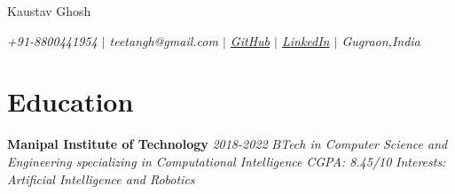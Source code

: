 \documentclass{article}
\makeatletter
\renewcommand{\maketitle}{
    \begin{flushleft}        
        {\huge\rmfamily
        \theauthor}\newline
        \vspace{0.1em}
        \textit{teetangh@gmail.com -- github.com/teetangh}\newline
        \textit{Contact No. -- +91-8800441954}\newline
        \textit{Manipal Institute of Technology}\newline
        \textit{B.Tech in \textbf{Computer Science \& Engineering}}
        \textit{2018 - 2022}\newline
        \textit{Minor in \textbf{Computational Intelligence}}\newline
        \textit{CGPA: 8.45/10}\newline
    \end{flushleft}

}
\makeatother
\begin{document}
\thispagestyle{empty}  %


\begin{center}
    \huge{Kaustav Ghosh}

    \normalsize{
        \textit{
            +91-8800441954 \(|\)
            teetangh@gmail.com \(|\)
            \href{https://www.github.com/teetangh}{GitHub} \(|\)
            \href{https://www.linkedin.com/in/kaustav-ghosh-1538651bb/}{LinkedIn} \(|\)
            Gugraon,India 
        }}
\end{center}

\section*{Education}

\textbf{Manipal Institute of Technology} \hfill \textit{2018-2022}
\textmd{\newline \textit{BTech in Computer Science and Engineering specializing in Computational Intelligence}} \hfill \textit{CGPA: 8.45/10}
\textmd{\newline \textit{Interests: Artificial Intelligence and Robotics}}
\end{document}
